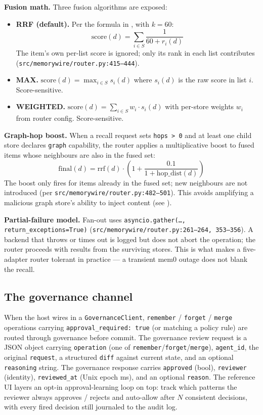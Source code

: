 \documentclass[11pt,letterpaper,twocolumn]{article}
\begin{document}
\textbf{Fusion math.} Three fusion algorithms are exposed:

\begin{itemize}[leftmargin=*]
  \item \textbf{RRF (default).} Per the formula in , with $k=60$:
    \[
      \mathrm{score}(d) = \sum_{i \in S} \frac{1}{60 + r_i(d)}
    \]
    The item's own per-list score is ignored; only its rank in each list contributes (\texttt{src/memorywire/router.py:415--444}).
  \item \textbf{MAX.} $\mathrm{score}(d) = \max_{i \in S} s_i(d)$ where $s_i(d)$ is the raw score in list $i$. Score-sensitive.
  \item \textbf{WEIGHTED.} $\mathrm{score}(d) = \sum_{i \in S} w_i \cdot s_i(d)$ with per-store weights $w_i$ from router config. Score-sensitive.
\end{itemize}

\textbf{Graph-hop boost.} When a recall request sets \texttt{hops > 0} and at least one child store declares \texttt{graph} capability, the router applies a multiplicative boost to fused items whose neighbours are also in the fused set:
\[
  \mathrm{final}(d) = \mathrm{rrf}(d) \cdot \left(1 + \frac{0.1}{1 + \mathrm{hop\_dist}(d)}\right)
\]
The boost only fires for items already in the fused set; new neighbours are not introduced (per \texttt{src/memorywire/router.py:482--501}). This avoids amplifying a malicious graph store's ability to inject content (see ).

\textbf{Partial-failure model.} Fan-out uses \texttt{asyncio.gather(\ldots, return\_exceptions=True)} (\texttt{src/memorywire/router.py:261--264, 353--356}). A backend that throws or times out is logged but does not abort the operation; the router proceeds with results from the surviving stores. This is what makes a five-adapter router tolerant in practice --- a transient mem0 outage does not blank the recall.

\subsection{The governance channel}
\label{sec:spec-governance}

When the host wires in a \texttt{GovernanceClient}, \texttt{remember} / \texttt{forget} / \texttt{merge} operations carrying \texttt{approval\_required: true} (or matching a policy rule) are routed through governance before commit. The governance review request is a JSON object carrying \texttt{operation} (one of \texttt{remember}/\texttt{forget}/\texttt{merge}), \texttt{agent\_id}, the original \texttt{request}, a structured \texttt{diff} against current state, and an optional \texttt{reasoning} string. The governance response carries \texttt{approved} (bool), \texttt{reviewer} (identity), \texttt{reviewed\_at} (Unix epoch ms), and an optional \texttt{reason}. The reference UI layers an opt-in approval-learning loop on top: track which patterns the reviewer always approves / rejects and auto-allow after $N$ consistent decisions, with every fired decision still journaled to the audit log.
\end{document}
